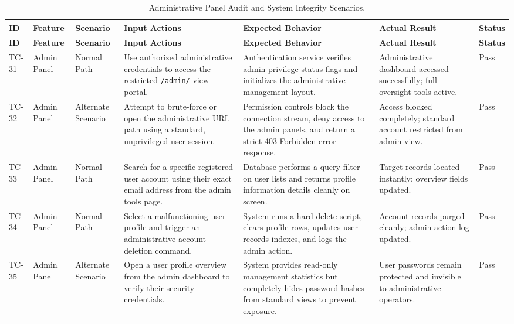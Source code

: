 \begingroup
\setlength{\tabcolsep}{3pt}
\renewcommand{\arraystretch}{1.3}
\begin{longtable}{|p{0.9cm}|>{\raggedright\arraybackslash}p{1.7cm}|>{\raggedright\arraybackslash}p{1.5cm}|>{\raggedright\arraybackslash}p{3.3cm}|>{\raggedright\arraybackslash}p{3.3cm}|>{\raggedright\arraybackslash}p{1.9cm}|>{\raggedright\arraybackslash}p{1.2cm}|}
	\caption{Administrative Panel Audit and System Integrity Scenarios.}
	\label{tab:tc_admin}\\
	\hline
	\textbf{ID} & \textbf{Feature} & \textbf{Scenario} & \textbf{Input Actions} & \textbf{Expected Behavior} & \textbf{Actual Result} & \textbf{Status} \\ \hline
	\endfirsthead
	\hline
	\textbf{ID} & \textbf{Feature} & \textbf{Scenario} & \textbf{Input Actions} & \textbf{Expected Behavior} & \textbf{Actual Result} & \textbf{Status} \\ \hline
	\endhead
	TC-31 & Admin Panel & Normal Path & Use authorized administrative credentials to access the restricted \texttt{/admin/} view portal. & Authentication service verifies admin privilege status flags and initializes the administrative management layout. & Administrative dashboard accessed successfully; full oversight tools active. & Pass \\ \hline
	TC-32 & Admin Panel & Alternate Scenario & Attempt to brute-force or open the administrative URL path using a standard, unprivileged user session. & Permission controls block the connection stream, deny access to the admin panels, and return a strict 403 Forbidden error response. & Access blocked completely; standard account restricted from admin view. & Pass \\ \hline
	TC-33 & Admin Panel & Normal Path & Search for a specific registered user account using their exact email address from the admin tools page. & Database performs a query filter on user lists and returns profile information details cleanly on screen. & Target records located instantly; overview fields updated. & Pass \\ \hline
	TC-34 & Admin Panel & Normal Path & Select a malfunctioning user profile and trigger an administrative account deletion command. & System runs a hard delete script, clears profile rows, updates user records indexes, and logs the admin action. & Account records purged cleanly; admin action log updated. & Pass \\ \hline
	TC-35 & Admin Panel & Alternate Scenario & Open a user profile overview from the admin dashboard to verify their security credentials. & System provides read-only management statistics but completely hides password hashes from standard views to prevent exposure. & User passwords remain protected and invisible to administrative operators. & Pass \\ \hline

\end{longtable}
